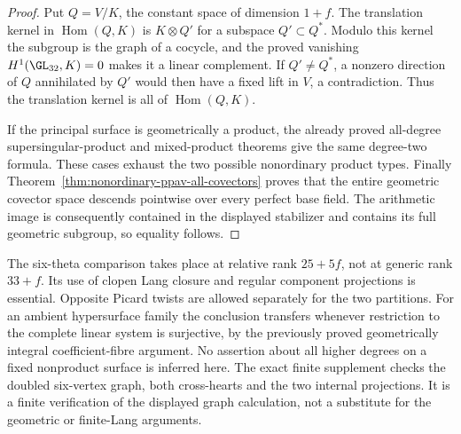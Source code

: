 \begin{proof}
Put $Q=V/K$, the constant space of dimension $1+f$. The
translation kernel in $\operatorname{Hom}(Q,K)$ is
$K\otimes Q'$ for a subspace $Q'\subset Q^*$. Modulo this
kernel the subgroup is the graph of a cocycle, and the proved
vanishing $H^1(\GL_{32},K)=0$ makes it a linear complement.
If $Q'\ne Q^*$, a nonzero direction of $Q$ annihilated by
$Q'$ would then have a fixed lift in $V$, a contradiction.
Thus the translation kernel is all of $\operatorname{Hom}(Q,K)$.

If the principal surface is geometrically a product, the
already proved all-degree supersingular-product and mixed-product
theorems give the same degree-two formula. These cases exhaust
the two possible nonordinary product types. Finally
Theorem~\ref{thm:nonordinary-ppav-all-covectors} proves that the
entire geometric covector space descends pointwise over every
perfect base field. The arithmetic image is consequently
contained in the displayed stabilizer and contains its full
geometric subgroup, so equality follows.
\end{proof}

\begin{remark}
\label{rem:nonordinary-ppav-degree-two-scope-candidate}
The six-theta comparison takes place at relative rank $25+5f$,
not at generic rank $33+f$. Its use of clopen Lang closure and
regular component projections is essential. Opposite Picard
twists are allowed separately for the two partitions.
For an ambient hypersurface family the conclusion transfers
whenever restriction to the complete linear system is surjective,
by the previously proved geometrically integral coefficient-fibre
argument. No assertion about all higher degrees on a fixed
nonproduct surface is inferred here. The exact finite supplement
checks the doubled six-vertex graph, both cross-hearts and the
two internal projections. It is a finite verification of the
displayed graph calculation, not a substitute for the geometric
or finite-Lang arguments.
\end{remark}
